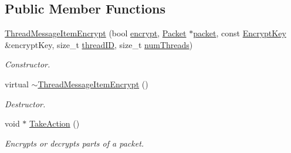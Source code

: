 \subsection*{Public Member Functions}
\begin{DoxyCompactItemize}
\item 
\hyperlink{class_thread_message_item_encrypt_abde8dfa6989926bf3af1a3e9b837cb71}{ThreadMessageItemEncrypt} (bool \hyperlink{class_thread_message_item_encrypt_ae46648288267f23d50fe2507f5bf4718}{encrypt}, \hyperlink{class_packet}{Packet} $\ast$\hyperlink{class_thread_message_item_encrypt_a7982d9c0673a2a733c5ce3fc5851bbda}{packet}, const \hyperlink{class_encrypt_key}{EncryptKey} \&encryptKey, size\_\-t \hyperlink{class_thread_message_item_encrypt_aeef5e81db47fca6a9acb7d57c6fc920b}{threadID}, size\_\-t \hyperlink{class_thread_message_item_encrypt_a3fe9fdadc77fa538812e831bd348696b}{numThreads})
\begin{DoxyCompactList}\small\item\em Constructor. \item\end{DoxyCompactList}\item 
\hypertarget{class_thread_message_item_encrypt_a1dc76b72e64ff7fe2f2b6183ea2a7586}{
virtual \hyperlink{class_thread_message_item_encrypt_a1dc76b72e64ff7fe2f2b6183ea2a7586}{$\sim$ThreadMessageItemEncrypt} ()}
\label{class_thread_message_item_encrypt_a1dc76b72e64ff7fe2f2b6183ea2a7586}

\begin{DoxyCompactList}\small\item\em Destructor. \item\end{DoxyCompactList}\item 
void $\ast$ \hyperlink{class_thread_message_item_encrypt_aaffd6c727e69eadac8efb947337e358d}{TakeAction} ()
\begin{DoxyCompactList}\small\item\em Encrypts or decrypts parts of a packet. \item\end{DoxyCompactList}\end{DoxyCompactItemize}
